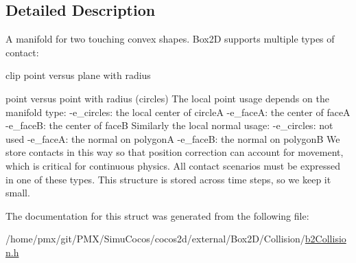 \subsection{Detailed Description}
A manifold for two touching convex shapes. Box2D supports multiple types of contact\+:
\begin{DoxyItemize}
\item clip point versus plane with radius
\item point versus point with radius (circles) The local point usage depends on the manifold type\+: -\/e\+\_\+circles\+: the local center of circleA -\/e\+\_\+faceA\+: the center of faceA -\/e\+\_\+faceB\+: the center of faceB Similarly the local normal usage\+: -\/e\+\_\+circles\+: not used -\/e\+\_\+faceA\+: the normal on polygonA -\/e\+\_\+faceB\+: the normal on polygonB We store contacts in this way so that position correction can account for movement, which is critical for continuous physics. All contact scenarios must be expressed in one of these types. This structure is stored across time steps, so we keep it small. 
\end{DoxyItemize}

The documentation for this struct was generated from the following file\+:\begin{DoxyCompactItemize}
\item 
/home/pmx/git/\+P\+M\+X/\+Simu\+Cocos/cocos2d/external/\+Box2\+D/\+Collision/\hyperlink{cocos2d_2external_2Box2D_2Collision_2b2Collision_8h}{b2\+Collision.\+h}\end{DoxyCompactItemize}
